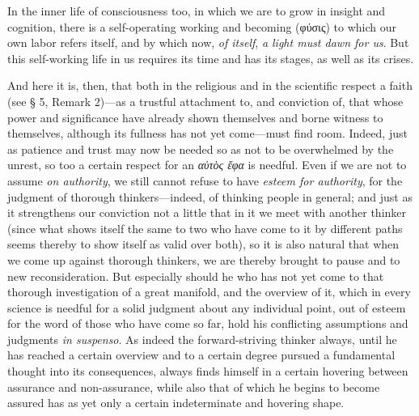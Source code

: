 \documentclass[12pt,a4paper]{book}
\begin{document}
In the inner life of consciousness too, in which we are to grow in insight and cognition, there is a
self-operating working and becoming (φύσις) to which our own labor refers itself, and by which now, \emph{of itself}, \emph{a light
must dawn for us}. But this self-working life in us requires its time and has its
stages, as well as its crises.

And here it is, then, that both in the religious and in the scientific respect a faith (see § 5,
Remark 2)---as a trustful attachment to, and conviction of, that whose power and significance have
already shown themselves and borne witness to themselves, although its fullness has not yet
come---must find room. Indeed, just as patience and trust may now be needed so as not to be
overwhelmed by the unrest, so too a certain respect for an \emph{αὐτὸς ἔφα} is needful. Even if we are not to
assume \emph{on authority}, we still cannot refuse to have \emph{esteem for authority}, for the
judgment of thorough thinkers---indeed, of thinking people in general; and just as it strengthens our
conviction not a little that in it we meet with another thinker (since what shows itself the same to
two who have come to it by different paths seems thereby to show itself as valid over both), so it is
also natural that when we come up against thorough thinkers, we are thereby brought to pause and to
new reconsideration. But especially should he who has not yet come to that thorough investigation of
a great manifold, and the overview of it, which in every science is needful for a solid judgment about
any individual point, out of esteem for the word of those who have come so far, hold his conflicting
assumptions and judgments \textit{in suspenso}. As indeed the forward-striving thinker always, until
he has reached a certain overview and to a certain degree pursued a fundamental thought into its
consequences, always finds himself in a certain hovering between assurance and non-assurance, while
also that of which he begins to become assured has as yet only a certain indeterminate and hovering
shape.
\end{document}
